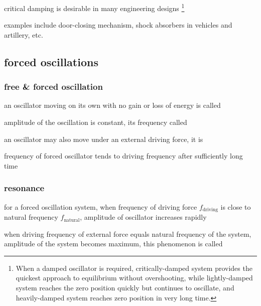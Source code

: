 \cmt critical damping is desirable in many engineering designs \footnote{When a damped oscillator is required, critically-damped system provides the quickest approach to equilibrium without overshooting, while lightly-damped system reaches the zero position quickly but continues to oscillate, and heavily-damped system reaches zero position in very long time.}

examples include door-closing mechanism, shock absorbers in vehicles and artillery, etc.



\subsection{forced oscillations}

\subsubsection{free \& forced oscillation}

an oscillator moving on its own with no gain or loss of energy is called 

amplitude of the oscillation is constant, its frequency called 

an oscillator may also move under an external driving force, it is 

frequency of forced oscillator tends to driving frequency after sufficiently long time

\subsubsection{resonance}

for a forced oscillation system, when frequency of driving force $f_\text{driving}$ is close to natural frequency $f_\text{natural}$, amplitude of oscillator increases rapidly

\begin{ilight}
	when driving frequency of external force equals natural frequency of the system, amplitude of the system becomes maximum, this phenomenon is called 
\end{ilight}


